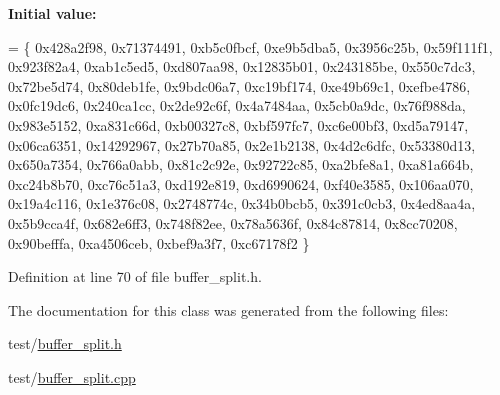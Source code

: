 {\bfseries Initial value\+:}
\begin{DoxyCode}
=
          \{
            0x428a2f98, 0x71374491, 0xb5c0fbcf, 0xe9b5dba5,
            0x3956c25b, 0x59f111f1, 0x923f82a4, 0xab1c5ed5,
            0xd807aa98, 0x12835b01, 0x243185be, 0x550c7dc3,
            0x72be5d74, 0x80deb1fe, 0x9bdc06a7, 0xc19bf174,
            0xe49b69c1, 0xefbe4786, 0x0fc19dc6, 0x240ca1cc,
            0x2de92c6f, 0x4a7484aa, 0x5cb0a9dc, 0x76f988da,
            0x983e5152, 0xa831c66d, 0xb00327c8, 0xbf597fc7,
            0xc6e00bf3, 0xd5a79147, 0x06ca6351, 0x14292967,
            0x27b70a85, 0x2e1b2138, 0x4d2c6dfc, 0x53380d13,
            0x650a7354, 0x766a0abb, 0x81c2c92e, 0x92722c85,
            0xa2bfe8a1, 0xa81a664b, 0xc24b8b70, 0xc76c51a3,
            0xd192e819, 0xd6990624, 0xf40e3585, 0x106aa070,
            0x19a4c116, 0x1e376c08, 0x2748774c, 0x34b0bcb5,
            0x391c0cb3, 0x4ed8aa4a, 0x5b9cca4f, 0x682e6ff3,
            0x748f82ee, 0x78a5636f, 0x84c87814, 0x8cc70208,
            0x90befffa, 0xa4506ceb, 0xbef9a3f7, 0xc67178f2
          \}
\end{DoxyCode}


Definition at line 70 of file buffer\+\_\+split.\+h.



The documentation for this class was generated from the following files\+:\begin{DoxyCompactItemize}
\item 
test/\hyperlink{buffer__split_8h}{buffer\+\_\+split.\+h}\item 
test/\hyperlink{buffer__split_8cpp}{buffer\+\_\+split.\+cpp}\end{DoxyCompactItemize}

